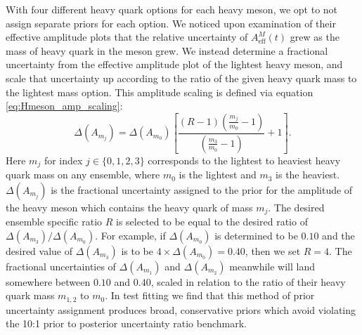 With four different heavy quark options for each heavy meson, we opt to not assign separate priors for each option.  We noticed upon examination of their effective amplitude plots that the relative uncertainty of $A^M_\mathrm{eff}(t)$ grew as the mass of heavy quark in the meson grew.  We instead determine a fractional uncertainty from the effective amplitude plot of the lightest heavy meson, and scale that uncertainty up according to the ratio of the given heavy quark mass to the lightest mass option.  This amplitude scaling is defined via equation \ref{eq:Hmeson_amp_scaling}:
\begin{equation}\label{eq:Hmeson_amp_scaling}
\Delta(A_{m_j}) = \Delta(A_{m_0}) \left[\frac{(R-1)(\frac{m_j}{m_0}-1)}{(\frac{m_3}{m_0}-1)} + 1  \right].    
\end{equation} 
Here $m_j$ for index $j\in\{0,1,2,3\}$ corresponds to the lightest to heaviest heavy quark mass on any ensemble, where $m_0$ is the lightest and $m_3$ is the heaviest.  $\Delta(A_{m_j})$ is the fractional uncertainty assigned to the prior for the amplitude of the heavy meson which contains the heavy quark of mass $m_j$.  The desired ensemble specific ratio $R$ is selected to be equal to the desired ratio of $\Delta(A_{m_3})/\Delta(A_{m_0})$.  For example, if $\Delta(A_{m_0})$ is determined to be $0.10$ and the desired value of $\Delta(A_{m_3})$ is to be $4\times\Delta(A_{m_0})=0.40$, then we set $R=4$.  The fractional uncertainties of $\Delta(A_{m_1})$ and $\Delta(A_{m_2})$ meanwhile will land somewhere between $0.10$ and $0.40$, scaled in relation to the ratio of their heavy quark mass $m_{1,2}$ to $m_0$.  In test fitting we find that this method of prior uncertainty assignment produces broad, conservative priors which avoid violating the 10:1 prior to posterior uncertainty ratio benchmark.  




